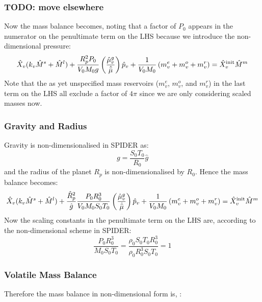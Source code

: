 \subsubsection{TODO: move elsewhere}
Now the mass balance becomes, noting that a factor of $P_0$ appears in the numerator on the penultimate term on the LHS because we introduce the non-dimensional pressure:
\begin{equation}
\hat{X}_v (k_v \hat{M}^s + \hat{M}^l) + \frac{R_p^2 P_0}{V_0 M_0 g} \left( \frac{\hat{\mu}_v^g}{\hat{\bar{\mu}}} \right) \hat{p}_v + \frac{1}{V_0 M_0} \left( m_v^e + m_v^o + m_v^r \right) = \hat{X}_v^{\rm init} \hat{M}^m
\end{equation}
Note that the as yet unspecified mass reservoirs ($m_v^e$, $m_v^o$, and $m_v^r$) in the last term on the LHS all exclude a factor of $4\pi$ since we are only considering scaled masses now.


\subsubsection{Gravity and Radius}
Gravity is non-dimensionalised in SPIDER as:
\begin{equation}
g = \frac{S_0 T_0}{R_0} \hat{g}
\end{equation}
and the radius of the planet $R_p$ is non-dimensionalised by $R_0$.  Hence the mass balance becomes:
\begin{equation}
\hat{X}_v (k_v \hat{M}^s + \hat{M}^l) + \frac{\hat{R}_p^2}{\hat{g}}\frac{P_0 R_0^3}{V_0 M_0 S_0 T_0} \left( \frac{\hat{\mu}_v^g}{\hat{\bar{\mu}}} \right) \hat{p}_v + \frac{1}{V_0 M_0} \left( m_v^e + m_v^o + m_v^r \right) = \hat{X}_v^{\rm init} \hat{M}^m
\end{equation}
Now the scaling constants in the penultimate term on the LHS are, according to the non-dimensional scheme in SPIDER:
\begin{equation}
\frac{P_0 R_0^3}{M_0 S_0 T_0} = \frac{\rho_0 S_0 T_0 R_0^3}{\rho_0 R_0^3 S_0 T_0} = 1
\end{equation}
\subsubsection{Volatile Mass Balance}
Therefore the mass balance in non-dimensional form is, :

